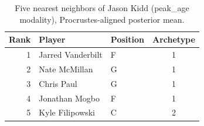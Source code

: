 \begin{table}[htbp]
  \centering\small
  \begin{tabular}{rllc}
    \toprule
    Rank & Player & Position & Archetype \\
    \midrule
    1 & Jarred Vanderbilt & F & 1 \\
    2 & Nate McMillan & G & 1 \\
    3 & Chris Paul & G & 1 \\
    4 & Jonathan Mogbo & F & 1 \\
    5 & Kyle Filipowski & C & 2 \\
    \bottomrule
  \end{tabular}
  \caption{Five nearest neighbors of Jason Kidd (peak_age modality), Procrustes-aligned posterior mean.}
  \label{tab:Jason_Kidd_neighbors_peak_age}
\end{table}

